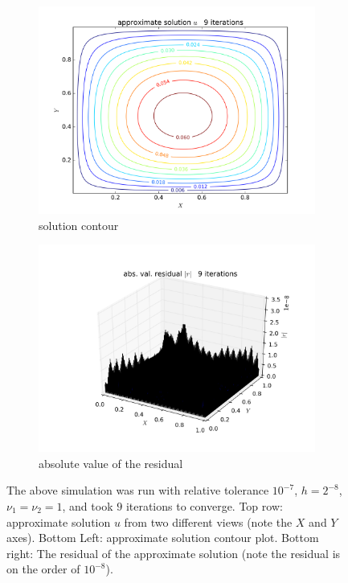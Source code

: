 \documentclass{article} %
\theoremstyle{plain}
\numberwithin{equation}{section} %
\numberwithin{figure}{section} %
\numberwithin{table}{section} %
\begin{document}
\begin{figure}[!htb]
\begin{subfigure}[b]{0.45\textwidth}
        \centering
        \includegraphics[width=\textwidth]{figures/p1_run1_4.png}
        \caption*{solution contour}
    \end{subfigure}
    \hfill
    \begin{subfigure}[b]{0.45\textwidth}
        \centering
        \includegraphics[width=\textwidth]{figures/p1_run1_3.png}
        \caption*{absolute value of the residual}
    \end{subfigure}
    \caption*{The above simulation was run with relative tolerance $10^{-7}$, $h=2^{-8}$, $\nu_1 = \nu_2 = 1$, and took $9$ iterations to converge.  Top row: approximate solution $u$ from two different views (note the $X$ and $Y$ axes).  Bottom Left: approximate solution contour plot.  Bottom right: The residual of the approximate solution (note the residual is on the order of $10^{-8}$).}
\end{figure}
\end{document}
